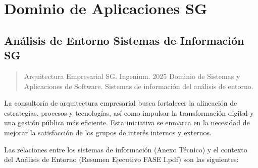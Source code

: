 \documentclass[
	a4paper, %
	12pt, %
]{include/CSSullivanBusinessReport}
\begin{document}
\newpage

\begin{twothirdswidth} %
	\tableofcontents %
\end{twothirdswidth}

\newpage


\newpage

\section{Dominio de Aplicaciones
SG}\label{sec:dominio-de-aplicaciones-sg}

\subsection{Análisis de Entorno Sistemas de Información
SG}\label{sec:anuxe1lisis-de-entorno-sistemas-de-informaciuxf3n-sg}

\begin{quote}
Arquitectura Empresarial SG. Ingenium. 2025 Dominio de Sistemas y
Aplicaciones de Software. Sistemas de información del análisis de
entorno.
\end{quote}

La consultoría de arquitectura empresarial busca fortalecer la
alineación de estrategias, procesos y tecnologías, así como impulsar la
transformación digital y una gestión pública más eficiente. Esta
iniciativa se enmarca en la necesidad de mejorar la satisfacción de los
grupos de interés internos y externos.

Las relaciones entre los sistemas de información (Anexo Técnico) y el
contexto del Análisis de Entorno (Resumen Ejecutivo FASE I.pdf) son las
siguientes:
\end{document}
